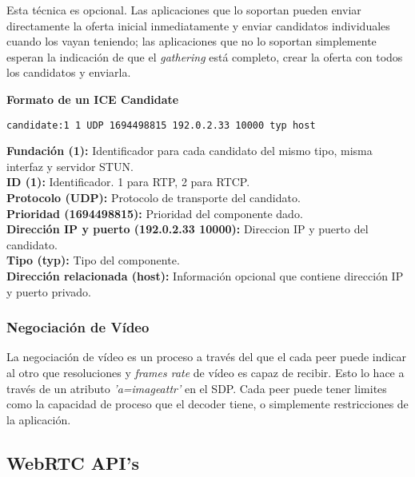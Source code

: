Esta técnica es opcional. Las aplicaciones que lo soportan pueden enviar directamente la oferta inicial inmediatamente y enviar candidatos individuales cuando los vayan teniendo; las aplicaciones que no lo soportan simplemente esperan la indicación de que el \textit{gathering} está completo, crear la oferta con todos los candidatos y enviarla.\\


\begin{normalsize}
\noindent \textbf{Formato de un ICE Candidate}\\
\end{normalsize}

\begin{lstlisting}[caption=Ejemplo paquete SDP]
candidate:1 1 UDP 1694498815 192.0.2.33 10000 typ host
\end{lstlisting}

\noindent \textbf{Fundación (1):} Identificador para cada candidato del mismo tipo, misma interfaz y servidor STUN.\\
\textbf{ID (1):} Identificador. 1 para RTP, 2 para RTCP.\\
\textbf{Protocolo (UDP):} Protocolo de transporte del candidato.\\
\textbf{Prioridad (1694498815): }Prioridad del componente dado.\\
\textbf{Dirección IP y puerto (192.0.2.33 10000): }Direccion IP y puerto del candidato.\\
\textbf{Tipo (typ):} Tipo del componente.\\
\textbf{Dirección relacionada (host):} Información opcional que contiene dirección IP y puerto privado.\\

\subsubsection{Negociación de Vídeo}

La negociación de vídeo es un proceso a través del que el cada peer puede indicar al otro que resoluciones y \textit{frames rate} de vídeo es capaz de recibir. Esto lo hace a través de un atributo \textit{'a=imageattr'} en el SDP. Cada peer puede tener limites como la capacidad de proceso que el decoder tiene, o simplemente restricciones de la aplicación.\\


\subsection{WebRTC API's}

